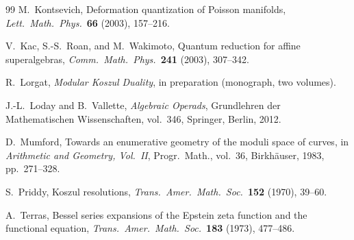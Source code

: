 \documentclass[11pt,reqno]{amsart}
\theoremstyle{definition}
\theoremstyle{remark}
\numberwithin{equation}{section}
\begin{document}
\begin{thebibliography}{99}
M.~Kontsevich,
Deformation quantization of Poisson manifolds,
\textit{Lett.\ Math.\ Phys.}~\textbf{66} (2003), 157--216.

V.~Kac, S.-S.~Roan, and M.~Wakimoto,
Quantum reduction for affine superalgebras,
\textit{Comm.\ Math.\ Phys.}~\textbf{241} (2003), 307--342.

R.~Lorgat,
\textit{Modular Koszul Duality},
in preparation (monograph, two volumes).

J.-L.~Loday and B.~Vallette,
\textit{Algebraic Operads},
Grundlehren der Mathematischen Wissenschaften, vol.~346,
Springer, Berlin, 2012.

D.~Mumford,
Towards an enumerative geometry of the moduli space of curves,
in \textit{Arithmetic and Geometry, Vol.~II},
Progr.\ Math., vol.~36, Birkh\"auser, 1983, pp.~271--328.

S.~Priddy,
Koszul resolutions,
\textit{Trans.\ Amer.\ Math.\ Soc.}~\textbf{152} (1970), 39--60.

A.~Terras,
Bessel series expansions of the Epstein zeta function
and the functional equation,
\textit{Trans.\ Amer.\ Math.\ Soc.}~\textbf{183} (1973), 477--486.

\end{thebibliography}
\end{document}
